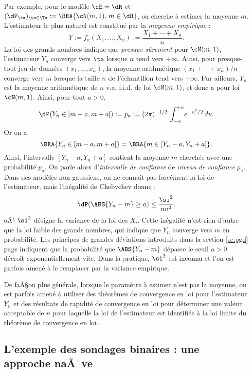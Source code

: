 Par exemple, pour le modèle $\cE=\dR$ et
$(\dP_\te)_{\te\in\Te}:=\BRA{\cN(m,1),\,m\in\dR}$, on cherche à estimer la moyenne
$m$. L'estimateur le plus naturel est constitué par la \emph{moyenne
  empirique} :
$$
Y:=f_n(X_1,\ldots,X_n):=\frac{X_1+\cdots+X_n}{n}.
$$
La loi des grands nombres indique que \emph{presque-sûrement} pour
$\cN(m,1)$, l'estimateur $Y_n$ converge vers $\te$ lorsque $n$ tend vers $+\infty$.
Ainsi, pour presque-tout jeu de données $(x_1,\ldots,x_n)$, la moyenne arithmétique
$(x_1+\cdots+x_n)/n$ converge vers $m$ lorsque la taille $n$ de l'échantillon tend
vers $+\infty$.  Par ailleurs, $Y_n$ est la moyenne arithmétique de $n$ v.a. i.i.d.
de loi $\cN(m,1)$, et donc a pour loi $\cN(m,1)$. Ainsi, pour tout $a>0$,
$$
\dP(Y_n\in [m-a,m+a]):=p_a:=(2\pi)^{-1/2}\,\int_{-a}^{+a}\!e^{-u^2/2}\,du.
$$
Or on a
$$
\BRA{Y_n\in [m-a,m+a]}=\BRA{m\in[Y_n-a,Y_n+a]}.
$$
Ainsi, l'intervalle $[Y_n-a,Y_n+a]$ contient la moyenne $m$ cherchée avec
une probabilité $p_a$. On parle alors d'\emph{intervalle de confiance} de
\emph{niveau de confiance} $p_a$. Dans des modèles non gaussiens, on ne
connait pas forcément la loi de l'estimateur, mais l'inégalité de Chebychev
donne :
$$
\dP(\ABS{Y_n-m} \geq a) \leq \frac{\si^2}{na^2},
$$
oÃ¹ $\si^2$ désigne la variance de la loi des $X_i$. Cette inégalité n'est
rien d'autre que la loi faible des grands nombres, qui indique que $Y_n$
converge vers $m$ en probabilité. Les principes de grandes déviations
introduits dans la section \ref{se:pgd} page \pageref{se:pgd} indiquent que la
probabilité que $\ABS{Y_n-m}$ dépasse le seuil $a>0$ décroit exponentiellement
vite. Dans la pratique, $\si^2$ est inconnu et l'on est parfois amené à le
remplacer par la variance empirique.

De faÃ§on plus générale, lorsque le paramètre à estimer n'est pas la moyenne,
on est parfois amené à utiliser des théorèmes de convergence en loi pour
l'estimateur $Y_n$ et des résultats de rapidité de convergence en loi pour
déterminer une valeur acceptable de $n$ pour laquelle la loi de l'estimateur
est identifiée à la loi limite du théorème de convergence en loi.

\subsection{L'exemple des sondages binaires : une approche naÃ¯ve}

